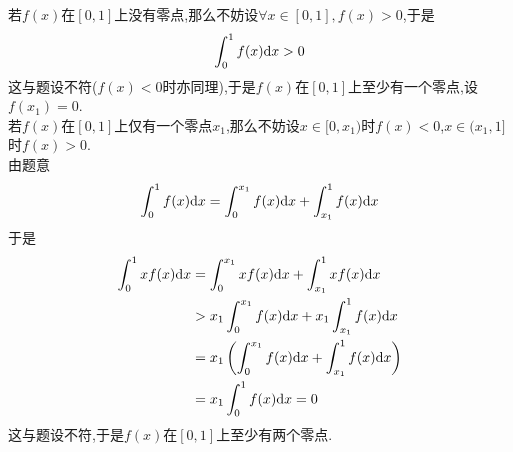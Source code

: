 \documentclass{ctexart}
\begin{document}
\begin{solution}[Proof.]
    若$f(x)$在$[0,1]$上没有零点,那么不妨设$\forall x\in[0,1],f(x)>0$,于是
    $$\int_{0}^{1}f(x)\mathrm{d} x>0$$
    这与题设不符($f(x)<0$时亦同理),于是$f(x)$在$[0,1]$上至少有一个零点,设$f(x_1)=0$.\\
    若$f(x)$在$[0,1]$上仅有一个零点$x_1$,那么不妨设$x\in[0,x_1)$时$f(x)<0$,$x\in(x_1,1]$时$f(x)>0$.\\
    由题意$$\int_0^1f(x)\mathrm{d} x=\int_0^{x_1}f(x)\mathrm{d} x+\int_{x_1}^1f(x)\mathrm{d} x$$
    于是$$\begin{aligned}
        \int_0^1xf(x)\mathrm{d} x
        &= \int_0^{x_1}xf(x)\mathrm{d} x+\int_{x_1}^{1}xf(x)\mathrm{d} x \\
        &> x_1\int_0^{x_1}f(x)\mathrm{d} x+x_1\int_{x_1}^1f(x)\mathrm{d} x \\
        &= x_1\left(\int_0^{x_1}f(x)\mathrm{d} x+\int_{x_1}^1f(x)\mathrm{d} x\right) \\
        &= x_1\int_0^1f(x)\mathrm{d} x =0
    \end{aligned}$$
    这与题设不符,于是$f(x)$在$[0,1]$上至少有两个零点.
\end{solution}
\end{document}

